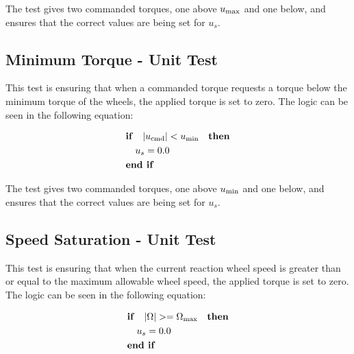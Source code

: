 The test gives two commanded torques, one above $u_{\textnormal{max}}$ and one below, and ensures that the correct values are being set for $u_s$.

\subsection{Minimum Torque - Unit Test}

This test is ensuring that when a commanded torque requests a torque below the minimum torque of the wheels, the applied torque is set to zero. The logic can be seen in the following equation:

\begin{equation}
\begin{gathered}
\begin{aligned}
&\textnormal{\textbf{if}}\quad \vert u_{\textnormal{cmd}} \vert < u_{\textnormal{min}}  \quad \textnormal{\textbf{then}}\\
&\quad u_s = 0.0 \\
&\textnormal{\textbf{end if}}\\
\end{aligned}
\end{gathered}
\label{eq:ballin2}
\end{equation}

The test gives two commanded torques, one above $u_{\textnormal{min}}$ and one below, and ensures that the correct values are being set for $u_s$.

\subsection{Speed Saturation - Unit Test}

This test is ensuring that when the current reaction wheel speed is greater than or equal to the maximum allowable wheel speed, the applied torque is set to zero. The logic can be seen in the following equation:

\begin{equation}
\begin{gathered}
\begin{aligned}
&\textnormal{\textbf{if}}\quad \vert \Omega \vert >= \Omega_{\text{max}}  \quad \textnormal{\textbf{then}}\\
&\quad u_s = 0.0 \\
&\textnormal{\textbf{end if}}\\
\end{aligned}
\end{gathered}
\label{eq:ballin3}
\end{equation}

